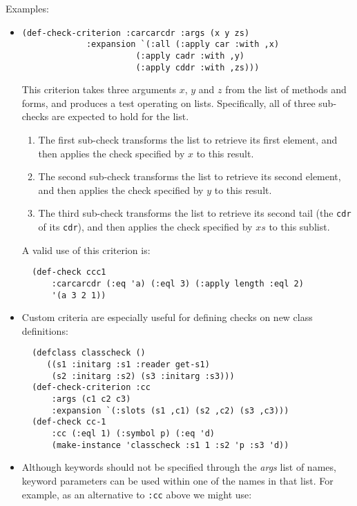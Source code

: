 \documentclass{article}
\begin{document}
Examples:
\begin{itemize}
\item{}
\begin{verbatim}
(def-check-criterion :carcarcdr :args (x y zs)
		     :expansion `(:all (:apply car :with ,x)
				       (:apply cadr :with ,y)
				       (:apply cddr :with ,zs)))
\end{verbatim}
  This criterion takes three arguments $x$, $y$ and $z$ from the list
  of methods and forms, and produces a test operating on lists.
  Specifically, all of three sub-checks are expected to hold for the
  list.
  \begin{enumerate}
  \item The first sub-check transforms the list to retrieve its first
    element, and then applies the check specified by $x$ to this
    result.
  \item The second sub-check transforms the list to retrieve its
    second element, and then applies the check specified by $y$ to
    this result.
  \item The third sub-check transforms the list to retrieve its second
    tail (the \texttt{cdr} of its \texttt{cdr}), and then applies the
    check specified by $xs$ to this sublist.
  \end{enumerate}
  A valid use of this criterion is:
\begin{verbatim}
  (def-check ccc1
      :carcarcdr (:eq 'a) (:eql 3) (:apply length :eql 2)
      '(a 3 2 1))
\end{verbatim}
\item Custom criteria are especially useful for defining checks on new
  class
  definitions:
\begin{verbatim}
  (defclass classcheck ()
     ((s1 :initarg :s1 :reader get-s1)
      (s2 :initarg :s2) (s3 :initarg :s3)))
  (def-check-criterion :cc
      :args (c1 c2 c3)
      :expansion `(:slots (s1 ,c1) (s2 ,c2) (s3 ,c3)))
  (def-check cc-1
      :cc (:eql 1) (:symbol p) (:eq 'd)
      (make-instance 'classcheck :s1 1 :s2 'p :s3 'd))
\end{verbatim}
\item Although keywords should not be specified through the
  \emph{args} list of names, keyword parameters can be used within one
  of the names in that list.  For example, as an alternative to
  \texttt{:cc} above we might
  use:
\begin{verbatim}

\end{verbatim}
\end{itemize}
\end{document}

